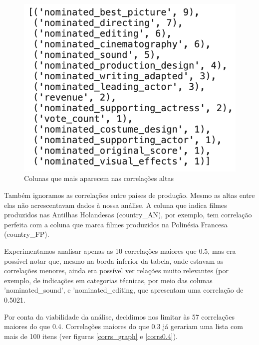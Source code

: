             \begin{figure}[htb]
            	\caption{\label{colunas_influentes}Colunas que mais aparecem nas correlações altas}
            	\begin{center}
            		\includegraphics[scale=0.7]{colunas_influentes.png}
            	\end{center}
            \end{figure}

            Também ignoramos as correlações entre países de produção. Mesmo as altas entre elas não acrescentavam dados à nossa análise. A coluna que indica filmes produzidos nas Antilhas Holandesas (country\_AN), por exemplo, tem correlação perfeita com a coluna que marca filmes produzidos na Polinésia Francesa (country\_FP).\par

            Experimentamos analisar apenas as 10 correlações maiores que 0.5, mas era possível notar que, mesmo na borda inferior da tabela, onde estavam as correlações menores, ainda era possível ver relações muito relevantes (por exemplo, de indicações em categorias técnicas, por meio das colunas 'nominated\_sound', e 'nominated\_editing, que apresentam uma correlação de 0.5021.\par

            Por conta da viabilidade da análise, decidimos nos limitar às 57 correlações maiores do que 0.4. Correlações maiores do que 0.3 já gerariam uma lista com mais de 100 itens (ver figuras \ref{corrs_graph} e \ref{corrs0.4}). \par
            
